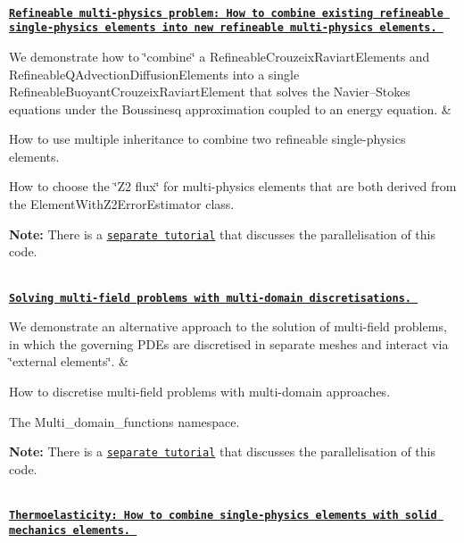 \begin{longtabu}
\\
\href{../../multi_physics/refine_b_convect/html/index.html}{\tt {\bfseries  Refineable multi-\/physics problem\+: How to combine existing refineable single-\/physics elements into new refineable multi-\/physics elements.} }

We demonstrate how to \char`\"{}combine\char`\"{} a {\ttfamily Refineable\+Crouzeix\+Raviart\+Elements} and {\ttfamily Refineable\+Q\+Advection\+Diffusion\+Elements} into a single {\ttfamily Refineable\+Buoyant\+Crouzeix\+Raviart\+Element} that solves the Navier--Stokes equations under the Boussinesq approximation coupled to an energy equation.  &
\begin{DoxyItemize}
\item How to use multiple inheritance to combine two refineable single-\/physics elements.
\item How to choose the \char`\"{}\+Z2 flux\char`\"{} for multi-\/physics elements that are both derived from the {\ttfamily Element\+With\+Z2\+Error\+Estimator} class.
\item {\bfseries Note\+:} There is a \href{../../mpi/boussinesq_convection/html/index.html}{\tt separate tutorial} that discusses the parallelisation of this code. 
\end{DoxyItemize}

\\
\href{../../multi_physics/multi_domain_ref_b_convect/html/index.html}{\tt {\bfseries  Solving multi-\/field problems with multi-\/domain discretisations.} }

We demonstrate an alternative approach to the solution of multi-\/field problems, in which the governing P\+D\+Es are discretised in separate meshes and interact via \char`\"{}external elements\char`\"{}.  &
\begin{DoxyItemize}
\item How to discretise multi-\/field problems with multi-\/domain approaches.
\item The {\ttfamily Multi\+\_\+domain\+\_\+functions} namespace.
\item {\bfseries Note\+:} There is a \href{../../mpi/boussinesq_convection/html/index.html}{\tt separate tutorial} that discusses the parallelisation of this code. 
\end{DoxyItemize}

\\
\label{_thermo}%
 \href{../../multi_physics/thermo/html/index.html}{\tt {\bfseries  Thermoelasticity\+: How to combine single-\/physics elements with solid mechanics elements.} }


\end{longtabu}
